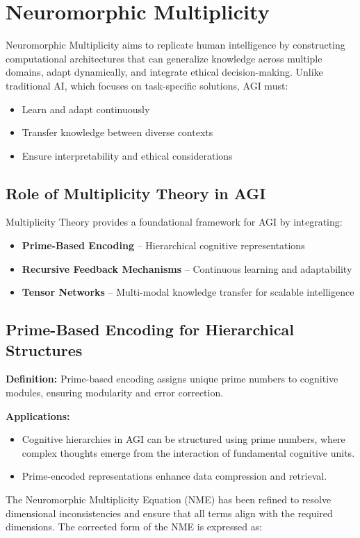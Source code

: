 \documentclass{article}
\theoremstyle{plain}
\begin{document}
\section{Neuromorphic Multiplicity}
Neuromorphic Multiplicity aims to replicate human intelligence by constructing computational architectures that can generalize knowledge across multiple domains, adapt dynamically, and integrate ethical decision-making. Unlike traditional AI, which focuses on task-specific solutions, AGI must:
\begin{itemize}
    \item Learn and adapt continuously
    \item Transfer knowledge between diverse contexts
    \item Ensure interpretability and ethical considerations
\end{itemize}

\subsection{Role of Multiplicity Theory in AGI}
Multiplicity Theory provides a foundational framework for AGI by integrating:
\begin{itemize}
    \item \textbf{Prime-Based Encoding} -- Hierarchical cognitive representations
    \item \textbf{Recursive Feedback Mechanisms} -- Continuous learning and adaptability
    \item \textbf{Tensor Networks} -- Multi-modal knowledge transfer for scalable intelligence
\end{itemize}
\subsection{Prime-Based Encoding for Hierarchical Structures}
\textbf{Definition:} Prime-based encoding assigns unique prime numbers to cognitive modules, ensuring modularity and error correction.

\textbf{Applications:}
\begin{itemize}
    \item Cognitive hierarchies in AGI can be structured using prime numbers, where complex thoughts emerge from the interaction of fundamental cognitive units.
    \item Prime-encoded representations enhance data compression and retrieval.
\end{itemize}

The Neuromorphic Multiplicity Equation (NME) has been refined to resolve dimensional inconsistencies and ensure that all terms align with the required dimensions. The corrected form of the NME is expressed as:
\end{document}
